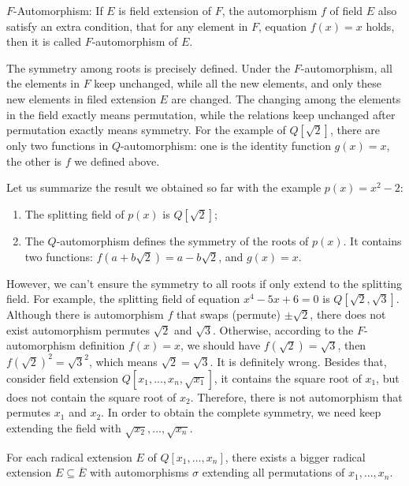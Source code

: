 \documentclass{article}
\begin{document}
\begin{definition}
$F$-Automorphism: If $E$ is field extension of $F$, the automorphism $f$ of field $E$ also satisfy an extra condition, that for any element in $F$, equation $f(x) = x$ holds, then it is called $F$-automorphism of $E$.
\end{definition}

The symmetry among roots is precisely defined. Under the $F$-automorphism, all the elements in $F$ keep unchanged, while all the new elements, and only these new elements in filed extension $E$ are changed. The changing among the elements in the field exactly means permutation, while the relations keep unchanged after permutation exactly means symmetry. For the example of $Q[\sqrt{2}]$, there are only two functions in $Q$-automorphism: one is the identity function $g(x) = x$, the other is $f$ we defined above.

Let us summarize the result we obtained so far with the example $p(x) = x^2 - 2$:

\begin{enumerate}
\item The splitting field of $p(x)$ is $Q[\sqrt{2}]$;
\item The $Q$-automorphism defines the symmetry of the roots of $p(x)$. It contains two functions: $f(a + b\sqrt{2}) = a - b\sqrt{2}$, and $g(x) = x$.
\end{enumerate}

However, we can't ensure the symmetry to all roots if only extend to the splitting field. For example, the splitting field of equation $x^4 - 5x + 6 = 0$ is $Q[\sqrt{2}, \sqrt{3}]$. Although there is automorphism $f$ that swaps (permute) $\pm \sqrt{2}$, there does not exist automorphism permutes $\sqrt{2}$ and $\sqrt{3}$. Otherwise, according to the $F$-automorphism definition $f(x) = x$, we should have $f(\sqrt{2}) = \sqrt{3}$, then $f(\sqrt{2})^2 = \sqrt{3}^2$, which means $\sqrt{2} = \sqrt{3}$. It is definitely wrong. Besides that, consider field extension $Q[x_1, ..., x_n, \sqrt{x_1}]$, it contains the square root of $x_1$, but does not contain the square root of $x_2$. Therefore, there is not automorphism that permutes $x_1$ and $x_2$. In order to obtain the complete symmetry, we need keep extending the field with $\sqrt{x_2}, ..., \sqrt{x_n}$.

\begin{theorem}
For each radical extension $E$ of $Q[x_1, ..., x_n]$, there exists a bigger radical extension $E \subseteq \overline{E}$ with automorphisms $\sigma$ extending all permutations of $x_1, ..., x_n$.
\end{theorem}
\end{document}
